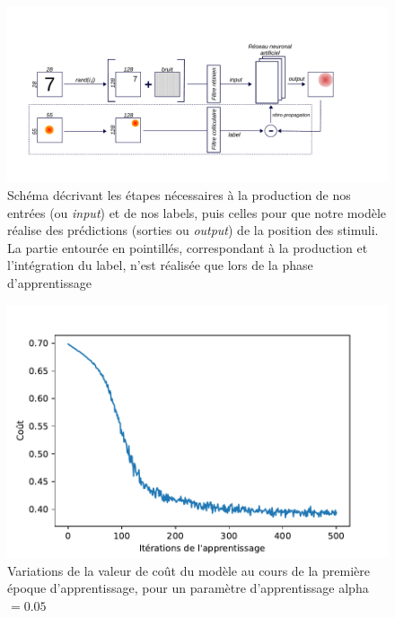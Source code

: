 \begin{figure}[th]
\centering
\includegraphics[scale=0.65]{Figures/Model}
\decoRule
\caption[Figure]{Schéma décrivant les étapes nécessaires à la production de nos entrées (ou \textit{input}) et de nos labels, puis celles pour que notre modèle réalise des prédictions (sorties ou \textit{output}) de la position des stimuli. La partie entourée en pointillés, correspondant à la production et l'intégration du label, n'est réalisée que lors de la phase d'apprentissage}
\label{fig:model}
\end{figure}


\begin{figure}[th]
\centering
\includegraphics[scale=0.8]{Figures/losses}
\decoRule
\caption[Figure]{Variations de la valeur de coût du modèle au cours de la première époque d'apprentissage, pour un paramètre d'apprentissage alpha$=0.05$}
\label{fig:losses}
\end{figure}

